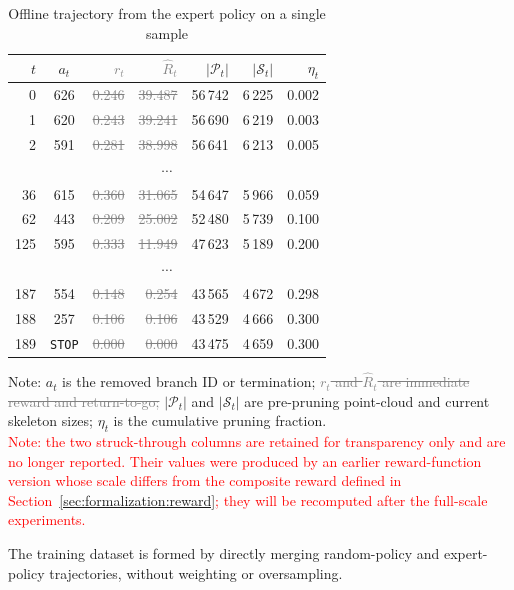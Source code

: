 \documentclass[12pt,a4paper,fontset=fandol]{ctexart}
\newcommand{\old}[1]{\textcolor{gray}{\sout{#1}}}
\newcommand{\rev}[1]{\textcolor{red}{#1}}
\begin{document}
\begin{table}[H]
\centering
\small
\setlength{\tabcolsep}{6pt}
\renewcommand{\arraystretch}{1.15}
\begin{tabular}{rcrrrrr}
\toprule
$t$ & $a_t$ & \old{$r_t$} & \old{$\hat{R}_t$} & $|\mathcal{P}_t|$ & $|\mathcal{S}_t|$ & $\eta_t$ \\
\midrule
0   & 626          & \old{0.246} & \old{39.487} & 56\,742 & 6\,225 & 0.002 \\
1   & 620          & \old{0.243} & \old{39.241} & 56\,690 & 6\,219 & 0.003 \\
2   & 591          & \old{0.281} & \old{38.998} & 56\,641 & 6\,213 & 0.005 \\
\multicolumn{7}{c}{$\cdots$} \\
36  & 615          & \old{0.360} & \old{31.065} & 54\,647 & 5\,966 & 0.059 \\
62  & 443          & \old{0.209} & \old{25.002} & 52\,480 & 5\,739 & 0.100 \\
125 & 595          & \old{0.333} & \old{11.949} & 47\,623 & 5\,189 & 0.200 \\
\multicolumn{7}{c}{$\cdots$} \\
187 & 554          & \old{0.148} & \old{0.254}  & 43\,565 & 4\,672 & 0.298 \\
188 & 257          & \old{0.106} & \old{0.106}  & 43\,529 & 4\,666 & 0.300 \\
189 & \texttt{STOP}& \old{0.000} & \old{0.000}  & 43\,475 & 4\,659 & 0.300 \\
\bottomrule
\end{tabular}
\caption{Offline trajectory from the expert policy on a single sample}
\label{tab:expert_traj_example}
\vspace{2pt}

\small Note: $a_t$ is the removed branch ID or termination; \old{$r_t$ and $\hat{R}_t$ are immediate reward and return-to-go;}
$|\mathcal{P}_t|$ and $|\mathcal{S}_t|$ are pre-pruning point-cloud and current skeleton sizes; $\eta_t$ is the cumulative pruning fraction.\\
\rev{Note: the two struck-through columns are retained for transparency only and are no longer reported. Their values were produced by an earlier reward-function version whose scale differs from the composite reward defined in Section~\ref{sec:formalization:reward}; they will be recomputed after the full-scale experiments.}
\end{table}

The training dataset is formed by directly merging random-policy and expert-policy trajectories,
without weighting or oversampling.
\end{document}
